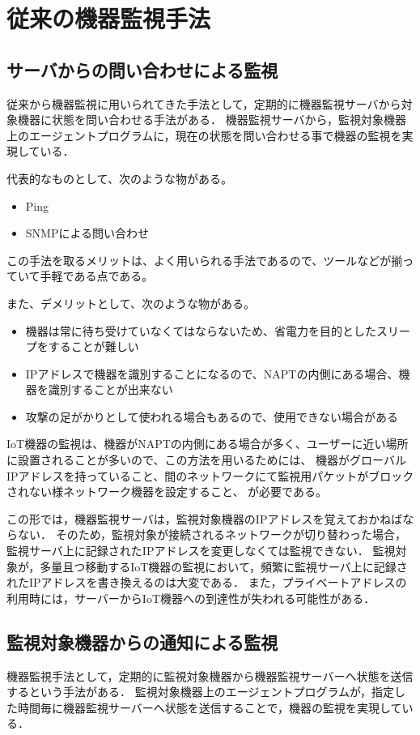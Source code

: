 \section{従来の機器監視手法}
\subsection{サーバからの問い合わせによる監視}
	従来から機器監視に用いられてきた手法として，定期的に機器監視サーバから対象機器に状態を問い合わせる手法がある．
	機器監視サーバから，監視対象機器上のエージェントプログラムに，現在の状態を問い合わせる事で機器の監視を実現している．
	\medskip

	代表的なものとして、次のような物がある。
	\begin{itemize}
		\item Ping
		\item SNMPによる問い合わせ
	\end{itemize}
	
	この手法を取るメリットは、よく用いられる手法であるので、ツールなどが揃っていて手軽である点である。
	
	また、デメリットとして、次のような物がある。
	\begin{itemize}
		\item 機器は常に待ち受けていなくてはならないため、省電力を目的としたスリープをすることが難しい
		\item IPアドレスで機器を識別することになるので、NAPTの内側にある場合、機器を識別することが出来ない
		\item 攻撃の足がかりとして使われる場合もあるので、使用できない場合がある
	\end{itemize}

	IoT機器の監視は、機器がNAPTの内側にある場合が多く、ユーザーに近い場所に設置されることが多いので、この方法を用いるためには、
	機器がグローバルIPアドレスを持っていること、間のネットワークにて監視用パケットがブロックされない様ネットワーク機器を設定すること、
	が必要である。

	この形では，機器監視サーバは，監視対象機器のIPアドレスを覚えておかねばならない．
	そのため，監視対象が接続されるネットワークが切り替わった場合，監視サーバ上に記録されたIPアドレスを変更しなくては監視できない．
	監視対象が，多量且つ移動するIoT機器の監視において，頻繁に監視サーバ上に記録されたIPアドレスを書き換えるのは大変である．
	また，プライベートアドレスの利用時には，サーバーからIoT機器への到達性が失われる可能性がある．

\subsection{監視対象機器からの通知による監視}
	機器監視手法として，定期的に監視対象機器から機器監視サーバーへ状態を送信するという手法がある．
	監視対象機器上のエージェントプログラムが，指定した時間毎に機器監視サーバーへ状態を送信することで，機器の監視を実現している．
	\medskip
	
